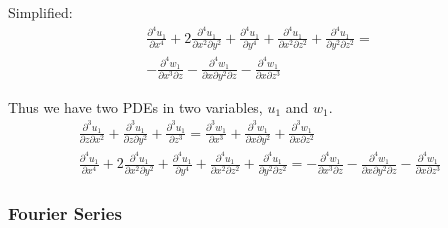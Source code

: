 \documentclass[12pt, a4paper, twoside, openright]{book}
\begin{document}
Simplified:
\begin{multline}
\frac{\partial^4 u_1}{\partial x^4} 
+ 2 \frac{\partial^4 u_1}{\partial x^2 \partial y^2} 
+ \frac{\partial^4 u_1}{\partial y^4}
+ \frac{\partial^4 u_1}{\partial x^2 \partial z^2} 
+ \frac{\partial^4 u_1}{\partial y^2 \partial z^2}
=  \\
- \frac{\partial^4 w_1}{\partial x^3 \partial z} 
- \frac{\partial^4 w_1}{\partial x \partial y^2 \partial z} 
- \frac{\partial^4 w_1}{\partial x \partial z^3} 
\end{multline}

Thus we have two PDEs in two variables, $u_1$ and $w_1$.
\begin{gather}
\frac{\partial^3 u_1}{\partial z \partial x^2} + \frac{\partial^3 u_1}{\partial z \partial y^2}
+ \frac{\partial^3 u_1}{\partial z^3} =
\frac{\partial^3 w_1}{\partial x^3} + \frac{\partial^3 w_1}{\partial x \partial y^2}
+ \frac{\partial^3 w_1}{\partial x \partial z^2} 
\\
\frac{\partial^4 u_1}{\partial x^4} 
+ 2 \frac{\partial^4 u_1}{\partial x^2 \partial y^2} 
+ \frac{\partial^4 u_1}{\partial y^4}
+ \frac{\partial^4 u_1}{\partial x^2 \partial z^2} 
+ \frac{\partial^4 u_1}{\partial y^2 \partial z^2}
=
- \frac{\partial^4 w_1}{\partial x^3 \partial z} 
- \frac{\partial^4 w_1}{\partial x \partial y^2 \partial z} 
- \frac{\partial^4 w_1}{\partial x \partial z^3} 
\end{gather}


\subsubsection*{Fourier Series}
\end{document}
